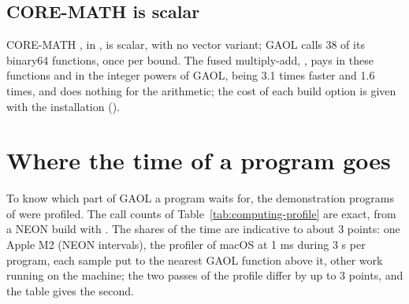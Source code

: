 \subsection{CORE-MATH is scalar}
%

CORE-MATH \cite{CoreMath:2022}, in , is scalar, with no
vector variant; GAOL calls 38 of its binary64 functions, once per bound.
The fused multiply-add, , pays in these functions and in
the integer powers of GAOL,  being 3.1 times faster and  1.6 times, and does nothing for the arithmetic; the cost of
each build option is given with the installation
().

\section{Where the time of a program goes}
\label{sec:where-time-goes}
%

To know which part of GAOL a program waits for, the demonstration programs of
 were profiled. The call counts of
Table~\ref{tab:computing-profile} are exact, from a NEON build with
. The shares of the time are indicative to
about 3 points: one Apple M2 (NEON intervals), the profiler  of
macOS at 1 ms during 3 s per program, each sample put to the nearest GAOL
function above it, other work running on the machine; the two passes of the
profile differ by up to 3 points, and the table gives the second.

